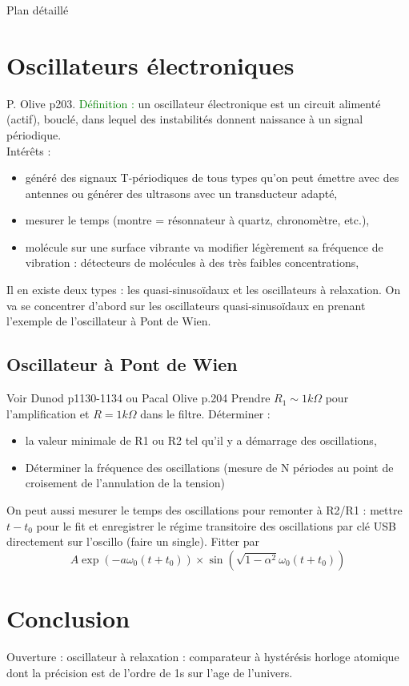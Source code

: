\begin{reportBlock}{Plan détaillé}
  \section{Oscillateurs électroniques}
  P. Olive p203. \textcolor{green}{Définition :} un oscillateur électronique est un circuit alimenté (actif), bouclé, dans lequel des instabilités donnent naissance à un signal périodique.\\
  Intérêts : 
  \begin{itemize}
      \item généré des signaux T-périodiques de tous types qu'on peut émettre avec des antennes ou générer des ultrasons avec un transducteur adapté,
      \item mesurer le temps (montre = résonnateur à quartz, chronomètre, etc.),
      \item molécule sur une surface vibrante va modifier légèrement sa fréquence de vibration : détecteurs de molécules à des très faibles concentrations,
  \end{itemize}
  Il en existe deux types : les quasi-sinusoïdaux et les oscillateurs à relaxation. On va se concentrer d'abord sur les oscillateurs quasi-sinusoïdaux en prenant l'exemple de l'oscillateur à Pont de Wien.
\subsection{Oscillateur à Pont de Wien}
Voir Dunod p1130-1134 ou Pacal Olive p.204 Prendre $R_1\sim 1k\Omega$ pour l'amplification et $R=1k\Omega$ dans le filtre. Déterminer : 
\begin{itemize}
    \item la valeur minimale de R1 ou R2 tel qu'il y a démarrage des oscillations,
    \item Déterminer la fréquence des oscillations (mesure de N périodes au point de croisement de l'annulation de la tension)
\end{itemize} 
On peut aussi mesurer le temps des oscillations pour remonter à R2/R1 : mettre $t-t_0$ pour le fit et enregistrer le régime transitoire des oscillations par clé USB directement sur l'oscillo (faire un single). Fitter par 
\begin{equation}
    A\exp\left(-a\omega_0(t+t_0)\right)\times\sin\left(\sqrt{1-\alpha^2}\omega_0(t+t_0)\right)
\end{equation}

\section*{Conclusion}
Ouverture : oscillateur à relaxation : comparateur à hystérésis horloge atomique dont la précision est de l'ordre de 1s sur l'age de l'univers.
\end{reportBlock}